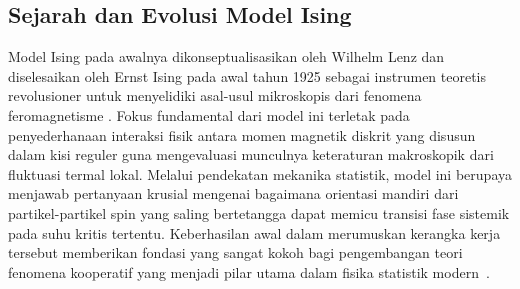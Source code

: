 \subsection{Sejarah dan Evolusi Model Ising}
Model Ising pada awalnya dikonseptualisasikan oleh Wilhelm Lenz dan diselesaikan oleh Ernst Ising pada awal tahun 1925 sebagai instrumen teoretis revolusioner untuk menyelidiki asal-usul mikroskopis dari fenomena feromagnetisme \cite{niss_history_2005}. Fokus fundamental dari model ini terletak pada penyederhanaan interaksi fisik antara momen magnetik diskrit yang disusun dalam kisi reguler guna mengevaluasi munculnya keteraturan makroskopik dari fluktuasi termal lokal. Melalui pendekatan mekanika statistik, model ini berupaya menjawab pertanyaan krusial mengenai bagaimana orientasi mandiri dari partikel-partikel spin yang saling bertetangga dapat memicu transisi fase sistemik pada suhu kritis tertentu. Keberhasilan awal dalam merumuskan kerangka kerja tersebut memberikan fondasi yang sangat kokoh bagi pengembangan teori fenomena kooperatif yang menjadi pilar utama dalam fisika statistik modern~\cite{feynman_simulating_1981}.

